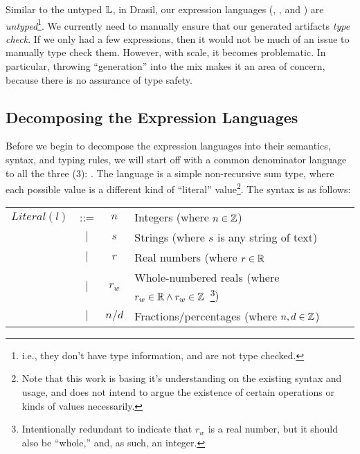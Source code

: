 Similar to the untyped \(\mathbb{L}\), in Drasil, our expression languages (\Expr{},
\CodeExpr{}, and \ModelExpr{}) are \textit{untyped}\footnote{i.e., they don't
have type information, and are not type checked.}. We currently need to manually
ensure that our generated artifacts \textit{type check}. If we only had a few
expressions, then it would not be much of an issue to manually type check them.
However, with scale, it becomes problematic. In particular, throwing
``generation'' into the mix makes it an area of concern, because there is no
assurance of type safety.

\subsection{Decomposing the Expression Languages}
\label{chap:typedExpr:sec:back-to-our-expression-languages:subsec:decomposing-the-expression-languages}

Before we begin to decompose the expression languages into their semantics,
syntax, and typing rules, we will start off with a common denominator language
to all the three (3): \Literal{}. The \Literal{} language is a simple
non-recursive sum type, where each possible value is a different kind of
``literal'' value\footnote{Note that this work is basing it's understanding on
      the existing syntax and usage, and does not intend to argue the existence of
      certain operations or kinds of values necessarily.}. The syntax is as follows:

\begin{longtable}{ r c c l}
      \(\mathit{Literal}(l)\) & ::=       & \(n\)              & Integers (where \(n \in \mathbb{Z}\))                \\
                              & \(\vert\) & \(s\)              & Strings (where \(s\) is any string of text)      \\
                              & \(\vert\) & \(r\)              & Real numbers (where \(r \in \mathbb{R}\)             \\
                              & \(\vert\) & \(r_w\)            & Whole-numbered
      reals (where \(r_w \in \mathbb{R} \land r_w \in \mathbb{Z}\)\
      \footnote{Intentionally redundant to indicate that \(r_w\) is a real
      number, but it should also be ``whole,'' and, as such, an integer.})                                        \\
                              & \(\vert\) & \(n \texttt{/} d\) & Fractions/percentages (where \(n,d \in \mathbb{Z}\)) \\
\end{longtable}

